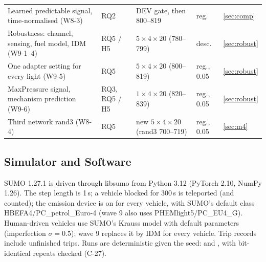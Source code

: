 \begin{table}[t]
\begin{tabular}{@{}p{5.3cm}p{1.5cm}p{6.0cm}p{2.5cm}l@{}}
Learned predictable signal, time-normalised (W8-3) & RQ2 & DEV gate, then 800--819 & reg. & \ref{sec:comp}\\
Robustness: channel, sensing, fuel model, IDM (W9-1--4) & RQ5 / H5 & $5\times4\times20$ (780--799) & desc. & \ref{sec:robust}\\
One adapter setting for every light (W9-5) & RQ5 & $5\times4\times20$ (800--819) & reg., 0.05 & \ref{sec:robust}\\
MaxPressure signal, mechanism prediction (W9-6) & RQ3, RQ5 / H5 & $1\times4\times20$ (820--839) & reg., 0.05 & \ref{sec:robust}\\
Third network rand3 (W8-4) & RQ5 & new $5\times4\times20$ (rand3 700--719) & reg., 0.05 & \ref{sec:m4}\\\bottomrule
\end{tabular}\end{table}

\subsection{Simulator and Software}
SUMO 1.27.1 \cite{lopez2018} is driven through libsumo from Python 3.12 (PyTorch 2.10, NumPy 1.26). The step length is 1\,s; a vehicle
blocked for 300\,s is teleported (and counted); the emission device is on for every vehicle, with SUMO's default class
HBEFA4/PC\_petrol\_Euro-4 \cite{krajzewicz2015} (wave 9 also uses PHEMlight5/PC\_EU4\_G). Human-driven vehicles use SUMO's Krauss model
\cite{krauss1998} with default parameters (imperfection $\sigma=0.5$); wave 9 replaces it by IDM \cite{treiber2000} for every vehicle.
Trip records include unfinished trips. Runs are deterministic given the seed:  and , with
bit-identical repeats checked (C-27).

